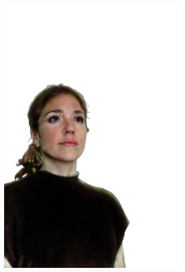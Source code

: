 \begin{figure}[ht]
\begin{subfigure}{0.08\linewidth}
        \includegraphics[width=\textwidth]{Figures/results/high/irene_rabbit/11_render.png}

\end{subfigure}
\end{figure}
